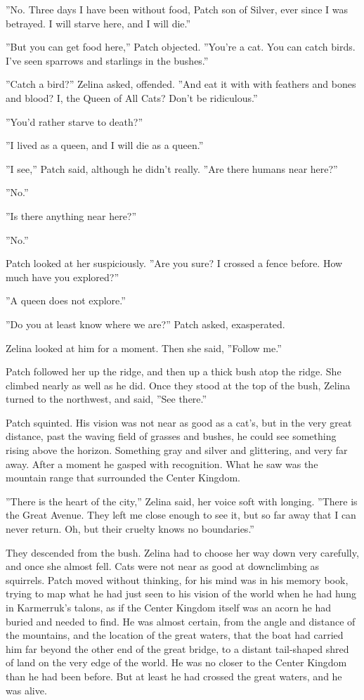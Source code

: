 \documentclass[12pt]{book}
\begin{document}
''No. Three days I have been without food, Patch son of Silver, ever since I was betrayed. I will starve here, and I will die.''

''But you can get food here,'' Patch objected. ''You're a cat. You can catch birds. I've seen sparrows and starlings in the bushes.''

''Catch a bird?'' Zelina asked, offended. ''And eat it with %
with feathers and bones and blood? I, the Queen of All Cats? Don't be ridiculous.''

''You'd rather starve to death?''

''I lived as a queen, and I will die as a queen.''

''I see,'' Patch said, although he didn't really. ''Are there humans near here?''

''No.''

''Is there anything near here?''

''No.''

Patch looked at her suspiciously. ''Are you sure? I crossed a fence before. How much have you explored?''

''A queen does not explore.''

''Do you at least know where we are?'' Patch asked, exasperated.

Zelina looked at him for a moment. Then she said, ''Follow me.''

Patch followed her up the ridge, and then up a thick bush atop the ridge. She climbed nearly as well as he did. Once they stood at the top of the bush, Zelina turned to the northwest, and said, ''See there.''

Patch squinted. His vision was not near as good as a cat's, but in the very great distance, past the waving field of grasses and bushes, he could see %
something %
rising above the horizon. Something gray and silver and glittering, and very far away. After a moment he gasped with recognition. What he saw was the mountain range that surrounded the Center Kingdom.

''There is the heart of the city,'' Zelina said, her voice soft with longing. ''There is the Great Avenue. They left me close enough to see it, but so far away that I can never return. Oh, but their cruelty knows no boundaries.''

They descended from the bush. Zelina had to choose her way down very carefully, and once she almost fell. Cats were not near as good at downclimbing as squirrels. Patch moved without thinking, for his mind was in his memory book, trying to map what he had just seen to his vision of the world when he had hung in Karmerruk's talons, as if the Center Kingdom itself was an acorn he had buried and needed to find. He was almost certain, from the angle and distance of the mountains, and the location of the great waters, that the boat had carried him far beyond the other end of the great bridge, to a distant tail-shaped shred of land on the very edge of the world. He was no closer to the Center Kingdom than he had been before. But at least he had crossed the great waters, and he was alive.
\end{document}
